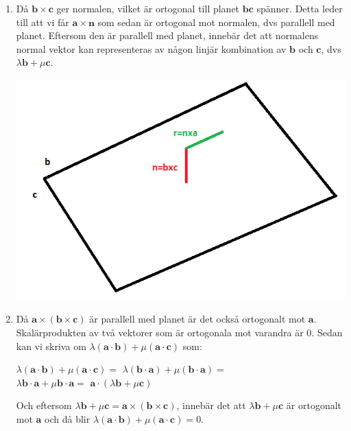 \documentclass[a4paper]{report}
\begin{document}
\begin{enumerate}
        \begin{enumerate}
            \item 
                Då $\bm{b}\times \bm{c}$ ger normalen, vilket är ortogonal till planet $\bm{bc}$ spänner. 
                Detta leder till att vi får $\bm{a}\times \bm{n}$ som sedan är ortogonal mot normalen, dvs parallell med planet.
                Eftersom den är parallell med planet, innebär det att normalens normal vektor kan representeras av någon linjär kombination av $\bm{b}$ och $\bm{c}$,
                dvs $\lambda\bm{b} + \mu\bm{c}$.
                \begin{center}
                    \includegraphics[scale=0.4]{bild2.png}
                \end{center}
            \item
                Då $\bm{a}\times (\bm{b}\times \bm{c})$ är parallell med planet är det också ortogonalt mot $\bm{a}$.
                Skalärprodukten av två vektorer som är ortogonala mot varandra är 0.
                Sedan kan vi skriva om $\lambda(\bm{a}\cdot\bm{b}) + \mu(\bm{a}\cdot\bm{c})$ som:
                \begin{center}
                    $\lambda(\bm{a}\cdot\bm{b}) + \mu(\bm{a}\cdot\bm{c})=$
                    $\lambda(\bm{b}\cdot\bm{a}) + \mu(\bm{b}\cdot\bm{a})=$\\
                    $\lambda\bm{b}\cdot\bm{a} + \mu\bm{b}\cdot\bm{a}=$
                    $\bm{a}\cdot(\lambda\bm{b} + \mu\bm{c})$
                \end{center}
                Och eftersom $\lambda\bm{b} + \mu\bm{c} = \bm{a}\times (\bm{b}\times \bm{c})$,
                innebär det att $\lambda\bm{b} + \mu\bm{c}$ är ortogonalt mot $\bm{a}$ och då blir $\lambda(\bm{a}\cdot\bm{b}) + \mu(\bm{a}\cdot\bm{c}) = 0$.


\end{enumerate}
\end{enumerate}
\end{document}
